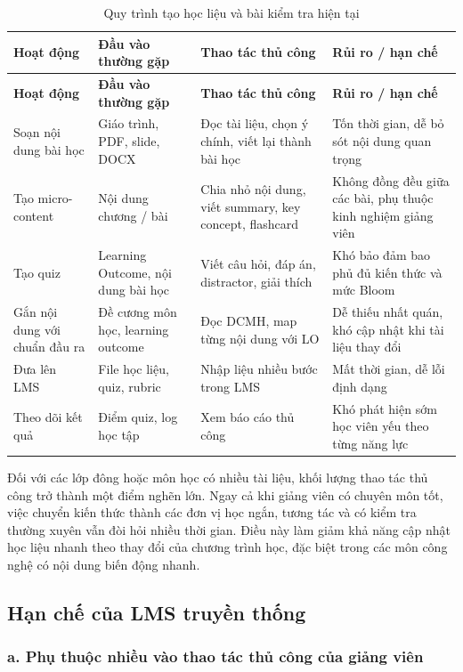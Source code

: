 \begin{longtable}{|p{3cm}|p{3cm}|p{4cm}|p{4cm}|}
\caption{Quy trình tạo học liệu và bài kiểm tra hiện tại}
\label{tab:quy-trinh-tao-hoc-lieu-hien-tai}\\
\hline
\textbf{Hoạt động} & \textbf{Đầu vào thường gặp} & \textbf{Thao tác thủ công} & \textbf{Rủi ro / hạn chế} \\
\hline
\endfirsthead
\hline
\textbf{Hoạt động} & \textbf{Đầu vào thường gặp} & \textbf{Thao tác thủ công} & \textbf{Rủi ro / hạn chế} \\
\hline
\endhead
Soạn nội dung bài học & Giáo trình, PDF, slide, DOCX & Đọc tài liệu, chọn ý chính, viết lại thành bài học & Tốn thời gian, dễ bỏ sót nội dung quan trọng \\
\hline
Tạo micro-content & Nội dung chương / bài & Chia nhỏ nội dung, viết summary, key concept, flashcard & Không đồng đều giữa các bài, phụ thuộc kinh nghiệm giảng viên \\
\hline
Tạo quiz & Learning Outcome, nội dung bài học & Viết câu hỏi, đáp án, distractor, giải thích & Khó bảo đảm bao phủ đủ kiến thức và mức Bloom \\
\hline
Gắn nội dung với chuẩn đầu ra & Đề cương môn học, learning outcome & Đọc DCMH, map từng nội dung với LO & Dễ thiếu nhất quán, khó cập nhật khi tài liệu thay đổi \\
\hline
Đưa lên LMS & File học liệu, quiz, rubric & Nhập liệu nhiều bước trong LMS & Mất thời gian, dễ lỗi định dạng \\
\hline
Theo dõi kết quả & Điểm quiz, log học tập & Xem báo cáo thủ công & Khó phát hiện sớm học viên yếu theo từng năng lực \\
\hline
\end{longtable}

Đối với các lớp đông hoặc môn học có nhiều tài liệu, khối lượng thao tác thủ
công trở thành một điểm nghẽn lớn. Ngay cả khi giảng viên có chuyên môn tốt,
việc chuyển kiến thức thành các đơn vị học ngắn, tương tác và có kiểm tra
thường xuyên vẫn đòi hỏi nhiều thời gian. Điều này làm giảm khả năng cập nhật
học liệu nhanh theo thay đổi của chương trình học, đặc biệt trong các môn công
nghệ có nội dung biến động nhanh.

\subsection{Hạn chế của LMS truyền thống}

\subsubsection*{a. Phụ thuộc nhiều vào thao tác thủ công của giảng viên}

